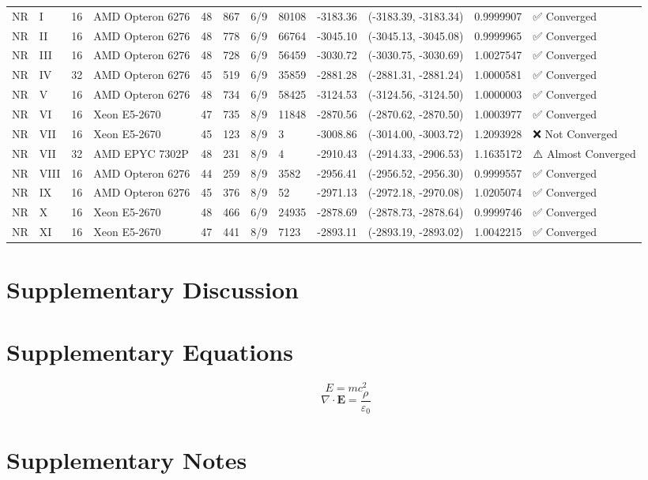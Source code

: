 \documentclass[12pt]{article}
\begin{document}
\begin{table}[
	htbp
	]
\begin{tabular}{@{}llllllllllll@{}}
		NR & I & 16 & AMD Opteron 6276 & 48 & 867 & 6/9 & 80108 & -3183.36 & (-3183.39, -3183.34) & 0.9999907 & ✅ Converged \\
		NR & II & 16 & AMD Opteron 6276 & 48 & 778 & 6/9 & 66764 & -3045.10 & (-3045.13, -3045.08) & 0.9999965 & ✅ Converged \\
		NR & III & 16 & AMD Opteron 6276 & 48 & 728 & 6/9 & 56459 & -3030.72 & (-3030.75, -3030.69) & 1.0027547 & ✅ Converged \\
		NR & IV & 32 & AMD Opteron 6276 & 45 & 519 & 6/9 & 35859 & -2881.28 & (-2881.31, -2881.24) & 1.0000581 & ✅ Converged \\
		NR & V & 16 & AMD Opteron 6276 & 48 & 734 & 6/9 & 58425 & -3124.53 & (-3124.56, -3124.50) & 1.0000003 & ✅ Converged \\
		NR & VI & 16 & Xeon E5-2670 & 47 & 735 & 8/9 & 11848 & -2870.56 & (-2870.62, -2870.50) & 1.0003977 & ✅ Converged \\
		NR & VII & 16 & Xeon E5-2670 & 45 & 123 & 8/9 &     3 & -3008.86 & (-3014.00, -3003.72) & 1.2093928 & ❌ Not Converged \\
		NR & VII & 32 & AMD EPYC 7302P & 48 & 231 & 8/9 &     4 & -2910.43 & (-2914.33, -2906.53) & 1.1635172 & ⚠️ Almost Converged \\
		NR & VIII & 16 & AMD Opteron 6276 & 44 & 259 & 8/9 &  3582 & -2956.41 & (-2956.52, -2956.30) & 0.9999557 & ✅ Converged \\
		NR & IX & 16 & AMD Opteron 6276 & 45 & 376 & 8/9 &    52 & -2971.13 & (-2972.18, -2970.08) & 1.0205074 & ✅ Converged \\
		NR & X & 16 & Xeon E5-2670 & 48 & 466 & 6/9 & 24935 & -2878.69 & (-2878.73, -2878.64) & 0.9999746 & ✅ Converged \\
		NR & XI & 16 & Xeon E5-2670 & 47 & 441 & 8/9 &  7123 & -2893.11 & (-2893.19, -2893.02) & 1.0042215 & ✅ Converged \\
		\hline
	\end{tabular}
\end{table}



\section*{Supplementary Discussion}
\label{sec:supp-discussion}
\lipsum[2] %

\section*{Supplementary Equations}
\label{sec:supp-equations}
\begin{equation}
E = mc^2
\end{equation}
\begin{equation}
\nabla \cdot \mathbf{E} = \frac{\rho}{\varepsilon_0}
\end{equation}

\section*{Supplementary Notes}
\label{sec:supp-notes}
\lipsum[3] %
\end{document}

